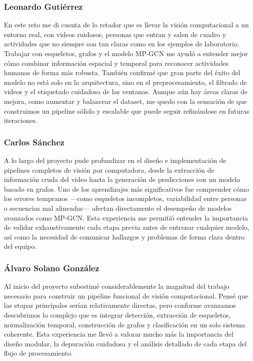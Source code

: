 \documentclass{article}
\begin{document}
\subsubsection*{Leonardo Gutiérrez}

En este reto me di cuenta de lo retador que es llevar la visión computacional a un entorno real, con videos ruidosos, personas que entran y salen de cuadro y actividades que no siempre son tan claras como en los ejemplos de laboratorio. Trabajar con esqueletos, grafos y el modelo MP-GCN me ayudó a entender mejor cómo combinar información espacial y temporal para reconocer actividades humanas de forma más robusta. También confirmé que gran parte del éxito del modelo no está solo en la arquitectura, sino en el preprocesamiento, el filtrado de videos y el etiquetado cuidadoso de las ventanas. Aunque aún hay áreas claras de mejora, como aumentar y balancear el dataset, me quedo con la sensación de que construimos un pipeline sólido y escalable que puede seguir refinándose en futuras iteraciones.

\subsubsection*{Carlos Sánchez}

A lo largo del proyecto pude profundizar en el diseño e implementación de pipelines completos de visión por computadora, desde la extracción de información cruda del video hasta la generación de predicciones con un modelo basado en grafos. Uno de los aprendizajes más significativos fue comprender cómo los errores tempranos —como esqueletos incompletos, variabilidad entre personas o secuencias mal alineadas— afectan directamente el desempeño de modelos avanzados como MP-GCN. Esta experiencia me permitió entender la importancia de validar exhaustivamente cada etapa previa antes de entrenar cualquier modelo, así como la necesidad de comunicar hallazgos y problemas de forma clara dentro del equipo.

\subsubsection*{Álvaro Solano González}

Al inicio del proyecto subestimé considerablemente la magnitud del trabajo necesario para construir un pipeline funcional de visión computacional. Pensé que las etapas principales serían relativamente directas, pero conforme avanzamos descubrimos lo complejo que es integrar detección, extracción de esqueletos, normalización temporal, construcción de grafos y clasificación en un solo sistema coherente. Esta experiencia me llevó a valorar mucho más la importancia del diseño modular, la depuración cuidadosa y el análisis detallado de cada etapa del flujo de procesamiento.
\end{document}
